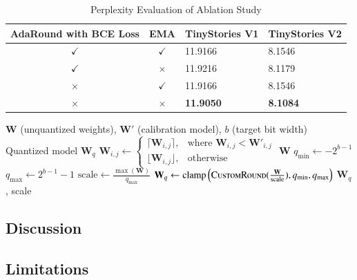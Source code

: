 \documentclass[../main.tex]{subfiles}
\begin{document}
\begin{table}[H]
\centering
\caption{Perplexity Evaluation of Ablation Study}
\label{tab:adaround_ablation_study}
\begin{tabular}{|c|c|l|l|}
\hline
AdaRound with BCE Loss & EMA          & TinyStories V1 & TinyStories V2  \\ \hline
$\checkmark$ & $\checkmark$ & 11.9166        & 8.1546          \\ \hline
$\checkmark$ & $\times$     & 11.9216        & 8.1179          \\ \hline
$\times$     & $\checkmark$ & 11.9166        & 8.1546          \\ \hline
$\times$     & $\times$     & \textbf{11.9050}        & \textbf{8.1084} \\ \hline
\end{tabular}
\end{table}

\begin{algorithm}[H]
\caption{Gradient-based Steering without AdaRound}\label{alg:ablate_adaround}
\begin{algorithmic}[1]
\Require $\mathbf{W}$ (unquantized weights), $\mathbf{W}'$ (calibration model), $b$ (target bit width)
\Ensure Quantized model $\mathbf{W}_q$
  \State $\mathbf{W}_{i,j} \gets \begin{cases}
    \lceil \mathbf{W}_{i, j} \rceil, &\text{where } \mathbf{W}_{i, j} < \mathbf{W}'_{i, j} \\
    \lfloor \mathbf{W}_{i, j} \rfloor, &\text{otherwise}
\end{cases}$
  \State \Return $\mathbf{W}$
\EndFunction
\State $q_{\text{min}} \gets -2^{b - 1}$
\State $q_{\text{max}} \gets 2^{b - 1} - 1$
\State $\text{scale} \gets \frac{\max(\mathbf{W})}{q_{\text{max}}}$
\State $\mathbf{W}_q \gets \text{clamp}\left(\textsc{CustomRound}(\frac{\mathbf{W}}{\text{scale}}), q_\text{min}, q_\text{max}\right)$
\State \Return $\mathbf{W}_q$, scale
\end{algorithmic}
\end{algorithm}

\subsection{Discussion}

\subsection{Limitations}
\end{document}
